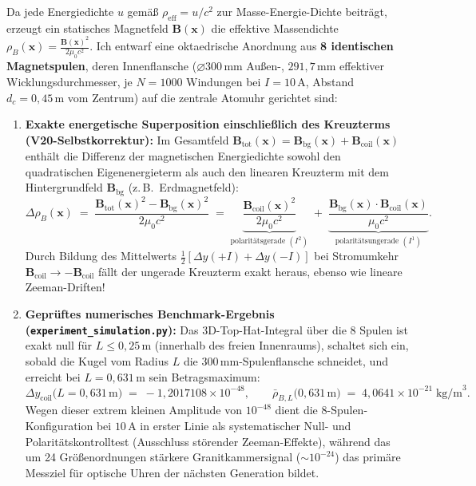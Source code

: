 \documentclass[10pt,a4paper]{article}
\begin{document}
\par
Da jede Energiedichte $u$ gem\"a\ss{} $\rho_{\text{eff}} = u/c^2$ zur Masse-Energie-Dichte beitr\"agt, erzeugt ein statisches Magnetfeld $\mathbf{B}(\mathbf{x})$ die effektive Massendichte $\rho_B(\mathbf{x}) = \frac{\mathbf{B}(\mathbf{x})^2}{2\mu_0 c^2}$. Ich entwarf eine oktaedrische Anordnung aus \textbf{8 identischen Magnetspulen}, deren Innenflansche ($\varnothing 300\,\text{mm}$ Au\ss en-, $291{,}7\,\text{mm}$ effektiver Wicklungsdurchmesser, je $N=1000$ Windungen bei $I=10\,\text{A}$, Abstand $d_c = 0{,}45\,\text{m}$ vom Zentrum) auf die zentrale Atomuhr gerichtet sind:
\begin{enumerate}\setlength{\itemsep}{1pt}\setlength{\parskip}{0pt}\setlength{\topsep}{1pt}
  \item \textbf{Exakte energetische Superposition einschlie\ss lich des Kreuzterms (V20-Selbstkorrektur):} Im Gesamtfeld $\mathbf{B}_{\text{tot}}(\mathbf{x}) = \mathbf{B}_{\text{bg}}(\mathbf{x}) + \mathbf{B}_{\text{coil}}(\mathbf{x})$ enth\"alt die Differenz der magnetischen Energiedichte sowohl den quadratischen Eigenenergieterm als auch den linearen Kreuzterm mit dem Hintergrundfeld $\mathbf{B}_{\text{bg}}$ (z.\,B.\ Erdmagnetfeld):
  \begin{equation}
    \Delta\rho_B(\mathbf{x}) \;=\; \frac{\mathbf{B}_{\text{tot}}(\mathbf{x})^2 - \mathbf{B}_{\text{bg}}(\mathbf{x})^2}{2\mu_0 c^2} \;=\; \underbrace{\frac{\mathbf{B}_{\text{coil}}(\mathbf{x})^2}{2\mu_0 c^2}}_{\text{polarit\"atsgerade }(I^2)} \;+\; \underbrace{\frac{\mathbf{B}_{\text{bg}}(\mathbf{x})\cdot\mathbf{B}_{\text{coil}}(\mathbf{x})}{\mu_0 c^2}}_{\text{polarit\"atsungerade }(I^1)}.
  \end{equation}
  Durch Bildung des Mittelwerts $\frac{1}{2}[\Delta y(+I) + \Delta y(-I)]$ bei Stromumkehr $\mathbf{B}_{\text{coil}} \to -\mathbf{B}_{\text{coil}}$ f\"allt der ungerade Kreuzterm exakt heraus, ebenso wie lineare Zeeman-Driften!
  \item \textbf{Gepr\"uftes numerisches Benchmark-Ergebnis (\texttt{experiment\_simulation.py}):} Das 3D-Top-Hat-Integral über die 8 Spulen ist exakt null f\"ur $L \le 0{,}25\,\text{m}$ (innerhalb des freien Innenraums), schaltet sich ein, sobald die Kugel vom Radius $L$ die $300\,\text{mm}$-Spulenflansche schneidet, und erreicht bei \textbf{$L = 0{,}631\,\text{m}$} sein Betragsmaximum:
  \begin{equation}
    \Delta y_{\text{coil}}\bigl(L = 0{,}631\,\text{m}\bigr) \;=\; -1{,}2017108\times 10^{-48}, \qquad \bar{\rho}_{B,L}\bigl(0{,}631\,\text{m}\bigr) \;=\; 4{,}0641\times 10^{-21}\;\text{kg/m}^3.
  \end{equation}
  Wegen dieser extrem kleinen Amplitude von $10^{-48}$ dient die 8-Spulen-Konfiguration bei $10\,\text{A}$ in erster Linie als systematischer Null- und Polarit\"atskontrolltest (Ausschluss st\"orender Zeeman-Effekte), w\"ahrend das um 24 Gr\"o\ss enordnungen st\"arkere Granitkammersignal ($\sim 10^{-24}$) das prim\"are Messziel f\"ur optische Uhren der n\"achsten Generation bildet.
\end{enumerate}
\end{document}
